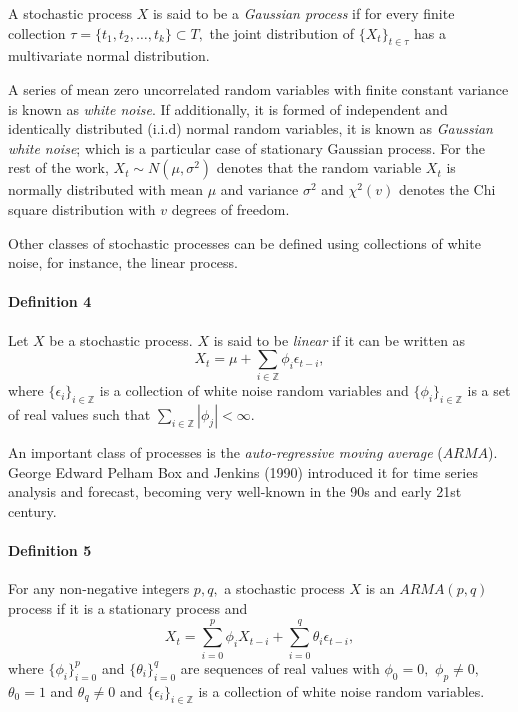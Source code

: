 A stochastic process \(X\) is said to be a \emph{Gaussian process} if for every finite collection \(\tau = \{t_1,t_2,\ldots, t_k\} \subset T,\) the joint distribution of \(\{X_t\}_{t \in \tau}\) has a multivariate normal distribution.

A series of mean zero uncorrelated random variables with finite constant variance is known as \emph{white noise}. If additionally, it is formed of independent and identically distributed (i.i.d) normal random variables, it is known as \emph{Gaussian white noise}; which is a particular case of stationary Gaussian process. For the rest of the work, \(X_t \sim N(\mu,\sigma^2)\) denotes that the random variable \(X_t\) is normally distributed with mean \(\mu\) and variance \(\sigma^2\) and \(\chi^2(v)\) denotes the Chi square distribution with \(v\) degrees of freedom.

Other classes of stochastic processes can be defined using collections of white noise, for instance, the linear process.

\hypertarget{definition-4}{%
\paragraph{Definition 4}\label{definition-4}}

Let \(X\) be a stochastic process. \(X\) is said to be \emph{linear} if it can be written as
\[
X_t = \mu + \sum_{i\in\mathbb{Z}}\phi_i\epsilon_{t-i},
\]
where \(\{\epsilon_i\}_{i\in\mathbb{Z}}\) is a collection of white noise random variables and \(\{\phi_i\}_{i\in\mathbb{Z}}\) is a set of real values such that \(\sum_{i\in\mathbb{Z}} |\phi_j| < \infty.\)

An important class of processes is the \emph{auto-regressive moving average} (\(ARMA\)). George Edward Pelham Box and Jenkins (1990) introduced it for time series analysis and forecast, becoming very well-known in the 90s and early 21st century.

\hypertarget{definition-5}{%
\paragraph{Definition 5}\label{definition-5}}

For any non-negative integers \(p,q,\) a stochastic process \(X\) is an \(ARMA(p,q)\) process if it is a stationary process and
\begin{equation}
  X_t = \sum_{i=0}^p \phi_iX_{t-i}  +\sum_{i=0}^q \theta_i\epsilon_{t-i}, \label{eq:ARMA}
\end{equation}
where \(\{\phi_i\}_{i=0}^p\) and \(\{\theta_i\}_{i=0}^q\) are sequences of real values with \(\phi_0= 0,\) \(\phi_p\neq 0,\) \(\theta_0=1\) and \(\theta_q\neq 0\) and \(\{\epsilon_{i}\}_{i\in\mathbb{Z}}\) is a collection of white noise random variables.

